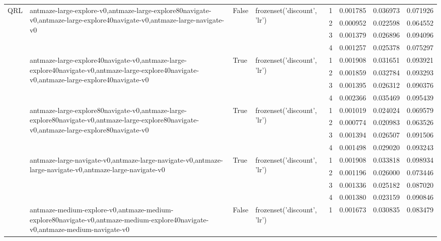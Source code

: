 \begin{tabular}{lllllrrr}
\multirow[t]{32}{*}{QRL} & \multirow[t]{4}{*}{antmaze-large-explore-v0,antmaze-large-explore80navigate-v0,antmaze-large-explore40navigate-v0,antmaze-large-navigate-v0} & \multirow[t]{4}{*}{False} & \multirow[t]{4}{*}{frozenset({'discount', 'lr'})} & 1 & 0.001785 & 0.036973 & 0.071926 \\
 &  &  &  & 2 & 0.000952 & 0.022598 & 0.064552 \\
 &  &  &  & 3 & 0.001379 & 0.026896 & 0.094096 \\
 &  &  &  & 4 & 0.001257 & 0.025378 & 0.075297 \\
\cline{2-8} \cline{3-8} \cline{4-8}
 & \multirow[t]{4}{*}{antmaze-large-explore40navigate-v0,antmaze-large-explore40navigate-v0,antmaze-large-explore40navigate-v0,antmaze-large-explore40navigate-v0} & \multirow[t]{4}{*}{True} & \multirow[t]{4}{*}{frozenset({'discount', 'lr'})} & 1 & 0.001908 & 0.031651 & 0.093921 \\
 &  &  &  & 2 & 0.001859 & 0.032784 & 0.093293 \\
 &  &  &  & 3 & 0.001395 & 0.026312 & 0.090376 \\
 &  &  &  & 4 & 0.002366 & 0.035469 & 0.095439 \\
\cline{2-8} \cline{3-8} \cline{4-8}
 & \multirow[t]{4}{*}{antmaze-large-explore80navigate-v0,antmaze-large-explore80navigate-v0,antmaze-large-explore80navigate-v0,antmaze-large-explore80navigate-v0} & \multirow[t]{4}{*}{True} & \multirow[t]{4}{*}{frozenset({'discount', 'lr'})} & 1 & 0.001019 & 0.024024 & 0.069579 \\
 &  &  &  & 2 & 0.000774 & 0.020983 & 0.063526 \\
 &  &  &  & 3 & 0.001394 & 0.026507 & 0.091506 \\
 &  &  &  & 4 & 0.001498 & 0.029020 & 0.093243 \\
\cline{2-8} \cline{3-8} \cline{4-8}
 & \multirow[t]{4}{*}{antmaze-large-navigate-v0,antmaze-large-navigate-v0,antmaze-large-navigate-v0,antmaze-large-navigate-v0} & \multirow[t]{4}{*}{True} & \multirow[t]{4}{*}{frozenset({'discount', 'lr'})} & 1 & 0.001908 & 0.033818 & 0.098934 \\
 &  &  &  & 2 & 0.001196 & 0.026000 & 0.073446 \\
 &  &  &  & 3 & 0.001336 & 0.025182 & 0.087020 \\
 &  &  &  & 4 & 0.001380 & 0.023159 & 0.090846 \\
\cline{2-8} \cline{3-8} \cline{4-8}
 & \multirow[t]{4}{*}{antmaze-medium-explore-v0,antmaze-medium-explore80navigate-v0,antmaze-medium-explore40navigate-v0,antmaze-medium-navigate-v0} & \multirow[t]{4}{*}{False} & \multirow[t]{4}{*}{frozenset({'discount', 'lr'})} & 1 & 0.001673 & 0.030835 & 0.083479 \\

\end{tabular}
